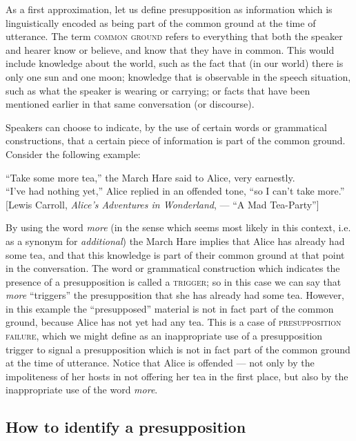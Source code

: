 As a first approximation, let us define presupposition as information which is linguistically encoded as being part of the common ground at the time of utterance. The term \textsc{common ground} refers to everything that both the speaker and hearer know or believe, and know that they have in common. This would include knowledge about the world, such as the fact that (in our world) there is only one sun and one moon; knowledge that is observable in the speech situation, such as what the speaker is wearing or carrying; or facts that have been mentioned earlier in that same conversation (or discourse).



Speakers can choose to indicate, by the use of certain words or grammatical constructions, that a certain piece of information is part of the common ground. Consider the following example:


\ea
“Take some more tea,” the March Hare said to Alice, very earnestly.\\
“I’ve had nothing yet,” Alice replied in an offended tone, “so I can’t take more.”\\{}
{}[Lewis Carroll, \textit{Alice’s Adventures in Wonderland},  — “A Mad Tea-Party”]
\z


By using the word \textit{more} (in the sense which seems most likely in this context, i.e. as a synonym for \textit{additional}) the March Hare implies that Alice has already had some tea, and that this knowledge is part of their common ground at that point in the conversation. The word or grammatical construction which indicates the presence of a presupposition is called a \textsc{trigger}; so in this case we can say that \textit{more} “triggers” the presupposition that she has already had some tea. However, in this example the “presupposed” material is not in fact part of the common ground, because Alice has not yet had any tea. This is a case of \textsc{presupposition failure}, which we might define as an inappropriate use of a presupposition trigger to signal a presupposition which is not in fact part of the common ground at the time of utterance. Notice that Alice is offended — not only by the impoliteness of her hosts in not offering her tea in the first place, but also by the inappropriate use of the word \textit{more}.


\subsection{How to identify a presupposition}\label{sec:3.4.1}

